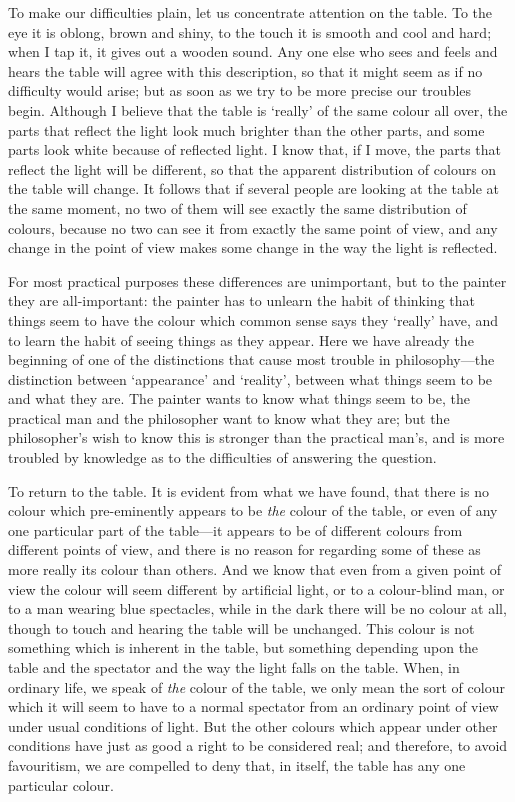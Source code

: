 \documentclass[oneside,letterpaper,12pt]{book}
\begin{document}
To make our difficulties plain, let us concentrate attention on the
table. To the eye it is oblong, brown and shiny, to the touch it is
smooth and cool and hard; when I tap it, it gives out a wooden sound.
Any one else who sees and feels and hears the table will agree with this
description, so that it might seem as if no difficulty would arise; but
as soon as we try to be more precise our troubles begin. Although I
believe that the table is `really' of
the same colour all over, the parts that reflect the light look much
brighter than the other parts, and some parts look white because of
reflected light. I know that, if I move, the parts that reflect the
light will be different, so that the apparent distribution of colours on
the table will change. It follows that if several people are looking at
the table at the same moment, no two of them will see exactly the same
distribution of colours, because no two can see it from exactly the same
point of view, and any change in the point of view makes some change in
the way the light is reflected.

For most practical purposes these differences are unimportant, but to
the painter they are all-important: the painter has to unlearn the habit
of thinking that things seem to have the colour which common sense says
they `really' have, and to learn the
habit of seeing things as they appear. Here we have already the
beginning of one of the distinctions that cause most trouble in
philosophy---the distinction between
`appearance' and
`reality', between what things seem to be
and what they are. The painter wants to know what things seem to be, the
practical man and the philosopher want to know what they are; but the
philosopher's wish to know this is stronger than the
practical man's, and is more troubled by knowledge as to
the difficulties of answering the question.

To return to the table. \label{evident} It is evident from what we have found, that
there is no colour which pre-eminently appears to be \emph{the} colour
of the table, or even of any one particular part of the table---it
appears to be of different colours from different points of view, and
there is no reason for regarding some of these as more really its colour
than others. And we know that even from a given point of view the colour
will seem different by artificial light, or to a colour-blind man, or to
a man wearing blue spectacles, while in the dark there will be no colour
at all, though to touch and hearing the table will be unchanged. This
colour is not something which is inherent in the table, but something
depending upon the table and the spectator and the way the light falls
on the table. When, in ordinary life, we speak of \emph{the} colour of
the table, we only mean the sort of colour which it will seem to have to
a normal spectator from an ordinary point of view under usual conditions
of light. But the other colours which appear under other conditions have
just as good a right to be considered real; and therefore, to avoid
favouritism, we are compelled to deny that, in itself, the table has any
one particular colour.
\end{document}
